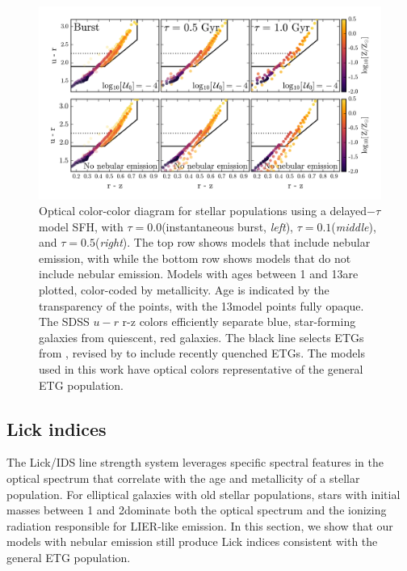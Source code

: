 \begin{figure}
  \begin{center}
    \includegraphics[width=\linewidth]{figs/f9.png}
    \caption{Optical color-color diagram for stellar populations using a delayed$-\tau$ model SFH, with $\tau=0.0$\Gyr (instantaneous burst, \emph{left}), $\tau=0.1$\Gyr (\emph{middle}), and $\tau=0.5$\Gyr (\emph{right}). The top row shows models that include nebular emission, with  while the bottom row shows models that do not include nebular emission. Models with ages between 1 and 13\Gyr are plotted, color-coded by metallicity. Age is indicated by the transparency of the points, with the 13\Gyr model points fully opaque. The SDSS $u-r$ \vs r-z colors efficiently separate blue, star-forming galaxies from quiescent, red galaxies. The black line selects ETGs from \citet{Holden+2012}, revised by \citet{McIntosh+2014} to include recently quenched ETGs. The models used in this work have optical colors representative of the general ETG population.}
    \label{fig:optCols}
  \end{center}
\end{figure}

\subsection{Lick indices} \label{sec:stars:continuum:lick}

The Lick/IDS line strength system \citep{Worthey+1994, Trager+2000} leverages specific spectral features in the optical spectrum that correlate with the age and metallicity of a stellar population. For elliptical galaxies with old stellar populations, stars with initial masses between 1 and 2\Msun dominate both the optical spectrum and the ionizing radiation responsible for LIER-like emission. In this section, we show that our models with nebular emission still produce Lick indices consistent with the general ETG population.

